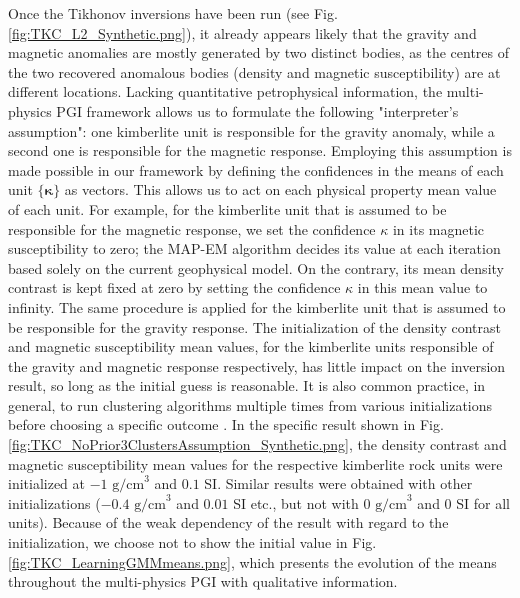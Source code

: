 \documentclass[extra, mreferee]{gji_joint} %
\begin{document}
Once the Tikhonov inversions have been run (see Fig. \ref{fig:TKC_L2_Synthetic.png}), it already appears likely that the gravity and magnetic anomalies are mostly generated by two distinct bodies, as the centres of the two recovered anomalous bodies (density and magnetic susceptibility) are at different locations. Lacking quantitative petrophysical information, the multi-physics PGI framework allows us to formulate the following "interpreter's assumption": one kimberlite unit is responsible for the gravity anomaly, while a second one is responsible for the magnetic response. Employing this assumption is made possible in our framework by defining the confidences in the means of each unit $\{\mathbf{\kappa}\}$ as vectors. This allows us to act on each physical property mean value of each unit. For example, for the kimberlite unit that is assumed to be responsible for the magnetic response, we set the confidence $\kappa$ in its magnetic susceptibility to zero; the MAP-EM algorithm decides its value at each iteration based solely on the current geophysical model. On the contrary, its mean density contrast is kept fixed at zero by setting the confidence $\kappa$ in this mean value to infinity. The same procedure is applied for the kimberlite unit that is assumed to be responsible for the gravity response. The initialization of the density contrast and magnetic susceptibility mean values, for the kimberlite units responsible of the gravity and magnetic response respectively, has little impact on the inversion result, so long as the initial guess is reasonable. It is also common practice, in general, to run clustering algorithms multiple times from various initializations before choosing a specific outcome \citep{ExpectationMaximization, Murphy2012}. In the specific result shown in Fig. \ref{fig:TKC_NoPrior3ClustersAssumption_Synthetic.png}, the density contrast and magnetic susceptibility mean values for the respective kimberlite rock units were initialized at $-1 \text{ g/cm}^3$ and $0.1$ SI. Similar results were obtained with other initializations ($-0.4 \text{ g/cm}^3$ and $0.01$ SI etc., but not with $0 \text{ g/cm}^3$ and $0$ SI for all units). Because of the weak dependency of the result with regard to the initialization, we choose not to show the initial value in Fig. \ref{fig:TKC_LearningGMMmeans.png}, which presents the evolution of the means throughout the multi-physics PGI with qualitative information.

\end{document}
